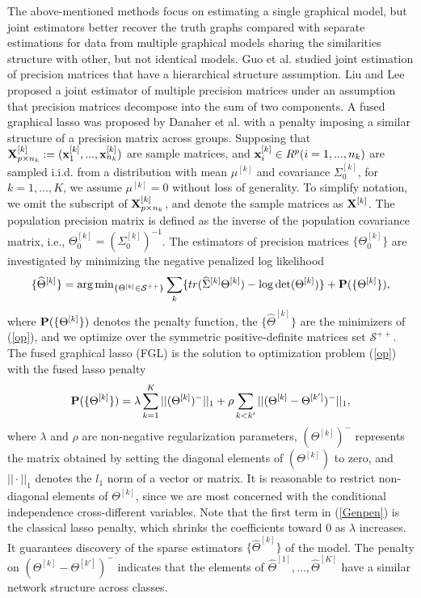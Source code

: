 \documentclass[review]{elsarticle}
\newcommand{\bbx}{{\bf x}}
\newcommand{\bbX}{{\bf X}}
\newcommand{\1}{{\bf 1}}
\newcommand{\0}{{\bf 0}}
\newcommand{\bqa}{\begin{eqnarray}}
\newcommand{\eqa}{\end{eqnarray}}
\begin{document}
 The above-mentioned methods focus on estimating a single graphical model, but joint estimators better recover the truth graphs compared with separate estimations for data from multiple graphical models sharing the similarities structure with other, but not identical models.
 Guo et al. \cite{guo2011joint} studied joint estimation of precision matrices that have a hierarchical structure assumption.
 Liu and Lee proposed a joint estimator of multiple precision matrices under an assumption that precision matrices decompose into the sum of two components.
 A fused graphical lasso was proposed by Danaher et al. \cite{Danaher2014The} with a penalty imposing a similar structure of a precision matrix across groups.
 Supposing that $\bbX^{[k]}_{p\times n_k}:=(\bbx_1^{[k]},...,\bbx_{n_k}^{[k]})$ are sample matrices, and $\bbx_{i}^{[k]}\in R^{p} (i=1,...,n_k)$ are sampled i.i.d. from a distribution with mean $\mu^{[k]}$ and covariance $\Sigma_0^{[k]}$, for $k=1,...,K$, we assume $\mu^{[k]}=0$ without loss of generality.
 To simplify notation, we omit the subscript of $\bbX^{[k]}_{p\times n_k}$, and denote the sample matrices as $\bbX^{[k]}$.
 The population precision matrix is defined as the inverse of the population covariance matrix, i.e., $\Theta_0^{[k]}=(\Sigma_0^{[k]})^{-1}$.
 The estimators of precision matrices $\{\Theta_0^{[k]}\}$ are investigated by minimizing the negative penalized log likelihood
\bqa\label{op}
\{\widehat{\Theta}^{[k]}\}={\arg\min}_{\{\Theta^{[k]}\in\mathcal{S}^{++}\}} \sum_{k} \{tr(\widehat\Sigma^{[k]}\Theta^{[k]})-\log \det(\Theta^{[k]})\}+{\bf{P}}(\{\Theta^{[k]}\}),
\eqa
 where ${\bf{P}}(\{\Theta^{[k]}\})$ denotes the penalty function, the $\{\widehat{\Theta}^{[k]}\}$ are the minimizers of (\ref{op}), and we optimize over the symmetric positive-definite matrices set $\mathcal{S}^{++}$.
 The fused graphical lasso (FGL) is the solution to optimization problem (\ref{op}) with the fused lasso penalty
\bqa\label{Genpen}
{\bf{P}}(\{\Theta^{[k]}\})=\lambda\sum_{k=1}^{K}||(\Theta^{[k]})^{-}||_{1}
+\rho\sum_{k<k'}||(\Theta^{[k]}
-\Theta^{[k']})^{-}||_1,
\eqa
 where $\lambda$ and $\rho$ are non-negative regularization parameters, $(\Theta^{[k]})^{-}$ represents the matrix obtained by setting the diagonal elements of $(\Theta^{[k]})$ to zero, and $||\cdot||_1$ denotes the $l_1$ norm of a vector or matrix.
 It is reasonable to restrict non-diagonal elements of $\Theta^{[k]}$, since we are most concerned with the conditional independence cross-different variables.
 Note that the first term in (\ref{Genpen}) is the classical lasso penalty, which shrinks the coefficients toward $0$ as $\lambda$ increases.
 It guarantees discovery of the sparse estimators $\{\widehat{\Theta}^{[k]}\}$ of the model.
 The penalty on $(\Theta^{[k]}
-\Theta^{[k']})^{-}$ indicates that the elements of $\widehat{\Theta}^{[1]},...,\widehat{\Theta}^{[K]}$ have a similar network structure across classes.
\end{document}
